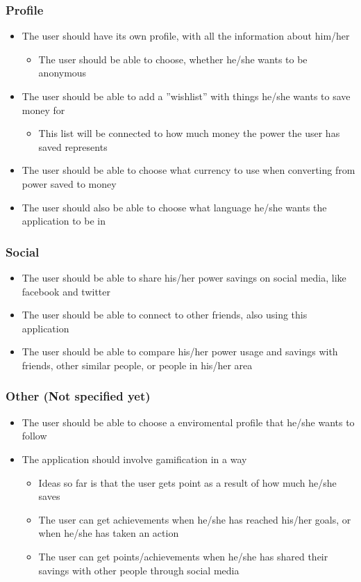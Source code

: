 \subsubsection{Profile}

\begin{itemize}
\item The user should have its own profile, with all the information about him/her
\begin{itemize}
\item The user should be able to choose, whether he/she wants to be anonymous
\end{itemize}
\item The user should be able to add a ''wishlist'' with things he/she wants to save money for
\begin{itemize}
\item This list will be connected to how much money the power the user has saved represents
\end{itemize}
\item The user should be able to choose what currency to use when converting from power saved to money
\item The user should also be able to choose what language he/she wants the application to be in
\end{itemize}


\subsubsection{Social}
\begin{itemize}
\item The user should be able to share his/her power savings on social media, like facebook and twitter
\item The user should be able to connect to other friends, also using this application
\item The user should be able to compare his/her power usage and savings with friends, other similar people, or people in his/her area
\end{itemize}

\subsubsection{Other (Not specified yet)}
\begin{itemize}
\item The user should be able to choose a enviromental profile that he/she wants to follow
\item The application should involve gamification in a way
\begin{itemize}
\item Ideas so far is that the user gets point as a result of how much he/she saves
\item The user can get achievements when he/she has reached his/her goals, or when he/she has taken an action
\item The user can get points/achievements when he/she has shared their savings with other people through social media
\end{itemize}
\end{itemize}


